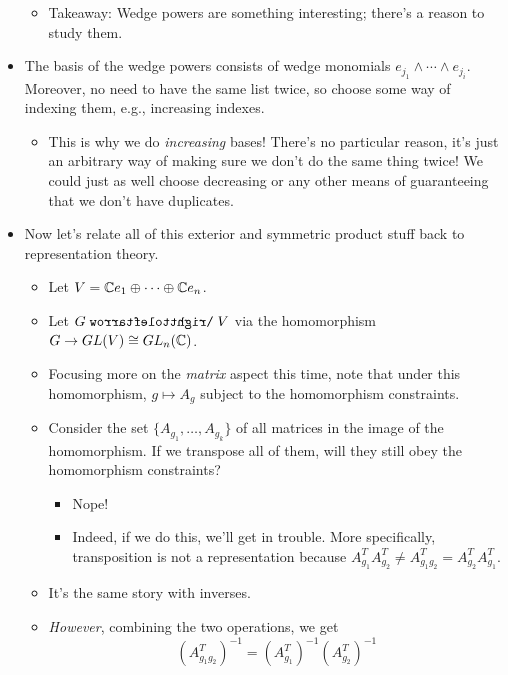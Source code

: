 \documentclass[../notes.tex]{subfiles}
\begin{document}
\begin{itemize}
\begin{itemize}
\begin{itemize}
        \end{itemize}
        \item Takeaway: Wedge powers are something interesting; there's a reason to study them.
    \end{itemize}
    \item The basis of the wedge powers consists of wedge monomials $e_{j_1}\wedge\cdots\wedge e_{j_i}$. Moreover, no need to have the same list twice, so choose some way of indexing them, e.g., increasing indexes.
    \begin{itemize}
        \item This is why we do \emph{increasing} bases! There's no particular reason, it's just an arbitrary way of making sure we don't do the same thing twice! We could just as well choose decreasing or any other means of guaranteeing that we don't have duplicates.
    \end{itemize}
    \item Now let's relate all of this exterior and symmetric product stuff back to representation theory.
    \begin{itemize}
        \item Let $V=\mathbb{C} e_1\oplus\cdots\oplus\mathbb{C} e_n$.
        \item Let $G\acts V$ via the homomorphism $G\to GL(V)\cong GL_n(\mathbb{C})$.
        \item Focusing more on the \emph{matrix} aspect this time, note that under this homomorphism, $g\mapsto A_g$ subject to the homomorphism constraints.
        \item Consider the set $\{A_{g_1},\dots,A_{g_k}\}$ of all matrices in the image of the homomorphism. If we transpose all of them, will they still obey the homomorphism constraints?
        \begin{itemize}
            \item Nope!
            \item Indeed, if we do this, we'll get in trouble. More specifically, transposition is not a representation because $A_{g_1}^TA_{g_2}^T\neq A_{g_1g_2}^T=A_{g_2}^TA_{g_1}^T$.
        \end{itemize}
        \item It's the same story with inverses.
        \item \emph{However}, combining the two operations, we get
        \begin{equation*}
            (A_{g_1g_2}^T)^{-1} = (A_{g_1}^T)^{-1}(A_{g_2}^T)^{-1}
        \end{equation*}
        \begin{itemize}

\end{itemize}
\end{itemize}
\end{itemize}
\end{document}
